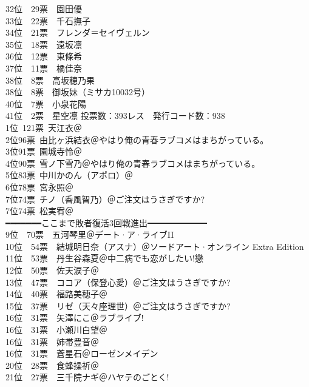 { 32位　29票　園田優\\
 33位　22票　千石撫子\\
 34位　21票　フレンダ＝セイヴェルン\\
 35位　18票　遠坂凛\\
 36位　12票　東條希\\
 37位　11票　橘佳奈\\
 38位　8票　高坂穂乃果\\
 38位　8票　御坂妹（ミサカ10032号）\\
 40位　7票　小泉花陽\\
 41位　2票　星空凛
 }{
 投票数：393レス　発行コード数：938\\
 1位~121票~天江衣＠\Saki\\
 2位\quad 96票~由比ヶ浜結衣{＠やはり俺の青春ラブコメはまちがっている。}\\
 3位\quad 91票~園城寺怜＠\Saki\\
 4位\quad 90票~雪ノ下雪乃{＠やはり俺の青春ラブコメはまちがっている。}\\
 5位\quad 83票~中川かのん（アポロ）＠{\Kaminomi}\\
 6位\quad 78票~宮永照＠\Saki\\
 7位\quad 74票~チノ（香風智乃）＠ご注文はうさぎですか?\\
 7位\quad 74票~松実宥＠\Saki\\
 ━━━━━━━ここまで敗者復活3回戦進出━━━━━━━\\
 9位　70票　五河琴里＠デート·ア·ライブII\\
 10位　54票　結城明日奈（アスナ）＠ソードアート·オンライン Extra Edition\\
 11位　53票　丹生谷森夏＠中二病でも恋がしたい!戀\\
 12位　50票　佐天涙子＠\Railgan\\
 13位　47票　ココア（保登心愛）＠ご注文はうさぎですか?\\
 14位　40票　福路美穂子＠\Saki\\
 15位　37票　リゼ（天々座理世）＠ご注文はうさぎですか?\\
 16位　31票　矢澤にこ＠ラブライブ!\\
 16位　31票　小瀬川白望＠\Saki\\
 16位　31票　姉帯豊音＠\Saki\\
 16位　31票　蒼星石＠ローゼンメイデン\\
 20位　28票　食蜂操祈＠\Railgan\\
 21位　27票　三千院ナギ＠ハヤテのごとく!\\
}
